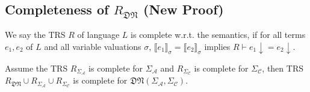 \documentclass[manuscript, review, timestamp]{acmart}
\newcommand*{\sem}[1]{\llbracket #1 \rrbracket}
\begin{document}
\subsection{Completeness of $R_\mathfrak{DN}$ (New Proof)}

\begin{definition}[completeness]
  We say the TRS $R$ of language $L$ is complete w.r.t. the semantics, if for all terms $e_1, e_2$ of $L$ and all variable valuations $\sigma$, $\sem{e_1}_\sigma = \sem{e_2}_\sigma$ implies $R \vdash e_1 \downarrow = e_2 \downarrow$.
\end{definition}

\begin{theorem}
  Assume the TRS $R_{\Sigma_\mathcal{A}}$ is complete for $\Sigma_\mathcal{A}$ and $R_{\Sigma_\mathcal{C}}$ is complete for $\Sigma_\mathcal{C}$, then TRS $R_\mathfrak{DN}\cup R_{\Sigma_\mathcal{A}} \cup R_{\Sigma_\mathcal{C}}$ is complete for $\mathfrak{DN}(\Sigma_\mathcal{A}, \Sigma_\mathcal{C})$.
\end{theorem}
\end{document}

